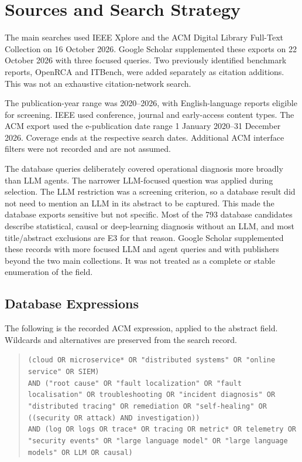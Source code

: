 \section{Sources and Search Strategy}

The main searches used IEEE Xplore and the ACM Digital Library Full-Text
Collection on 16 October 2026. Google Scholar supplemented these exports
on 22 October 2026 with three focused queries. Two previously identified
benchmark reports, OpenRCA and ITBench, were added separately as citation
additions. This was not an exhaustive citation-network search.

The publication-year range was 2020--2026, with English-language reports
eligible for screening. IEEE used conference, journal and early-access
content types. The ACM export used the e-publication date range
1 January 2020--31 December 2026. Coverage ends at the respective search
dates. Additional ACM interface filters were not recorded and are not
assumed.

The database queries deliberately covered operational diagnosis more
broadly than LLM agents. The narrower LLM-focused question was applied
during selection. The LLM restriction was a screening criterion, so a
database result did not need to mention an LLM in its abstract to be
captured. This made the database exports sensitive but not specific. Most
of the 793 database candidates describe statistical, causal or
deep-learning diagnosis without an LLM, and most title/abstract exclusions
are E3 for that reason. Google Scholar supplemented these records with
more focused LLM and agent queries and with publishers beyond the two main
collections. It was not treated as a complete or stable enumeration of the
field.

\subsection{Database Expressions}

The following is the recorded ACM expression, applied to the abstract
field. Wildcards and alternatives are preserved from the search record.

\begin{quote}\small\raggedright
\texttt{(cloud OR microservice* OR "distributed systems" OR "online service" OR SIEM)}\\[3pt]
\texttt{AND ("root cause" OR "fault localization" OR "fault localisation" OR troubleshooting OR "incident diagnosis" OR "distributed tracing" OR remediation OR "self-healing" OR ((security OR attack) AND investigation))}\\[3pt]
\texttt{AND (log OR logs OR trace* OR tracing OR metric* OR telemetry OR "security events" OR "large language model" OR "large language models" OR LLM OR causal)}
\end{quote}

